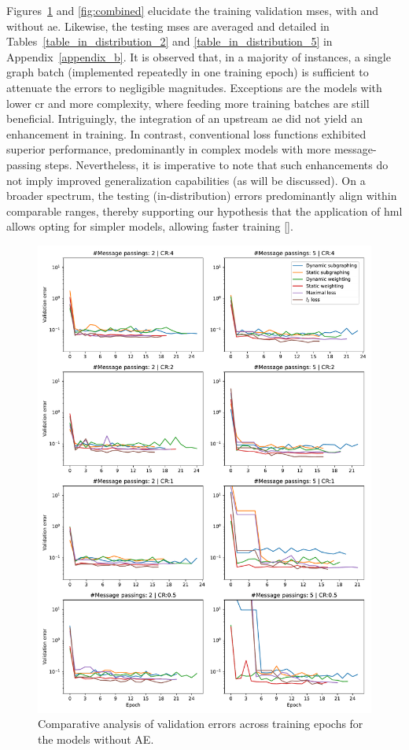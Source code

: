 Figures~\ref{fig:gnn} and \ref{fig:combined} elucidate the training validation \acp{mse}, with and without \ac{ae}. Likewise, the testing \acp{mse} are averaged and detailed in Tables~\ref{table_in_distribution_2} and \ref{table_in_distribution_5} in Appendix~\ref{appendix_b}. It is observed that, in a majority of instances, a single graph batch (implemented repeatedly in one training epoch) is sufficient to attenuate the errors to negligible magnitudes. Exceptions are the models with lower \ac{cr} and more complexity, where feeding more training batches are still beneficial. Intriguingly, the integration of an upstream \ac{ae} did not yield an enhancement in training. In contrast, conventional loss functions exhibited superior performance, predominantly in complex models with more message-passing steps. Nevertheless, it is imperative to note that such enhancements do not imply improved generalization capabilities (as will be discussed). On a broader spectrum, the testing (in-distribution) errors predominantly align within comparable ranges, thereby supporting our hypothesis that the application of \ac{hml} allows opting for simpler models, allowing faster training [\cite{tan2021}].
%
\begin{figure}\centering
\includegraphics[width=1\linewidth,keepaspectratio]{gnn.pdf}
\caption{Comparative analysis of validation errors across training epochs for the models without AE.}\label{fig:gnn}
\end{figure}
